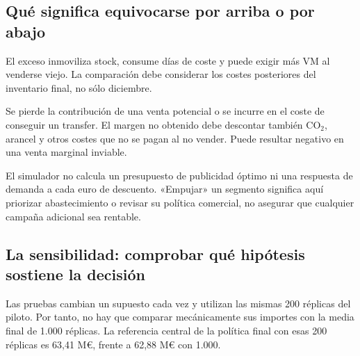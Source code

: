 \subsection{Qué significa equivocarse por arriba o por abajo}
\begin{description}[style=nextline]
\item[Pasarse.] El exceso inmoviliza stock, consume días de coste y puede exigir
más VM al venderse viejo. La comparación debe considerar los costes posteriores
del inventario final, no sólo diciembre.
\item[Quedarse corto.] Se pierde la contribución de una venta potencial o se
incurre en el coste de conseguir un transfer. El margen no obtenido debe
descontar también CO$_2$, arancel y otros costes que no se pagan al no vender.
Puede resultar negativo en una venta marginal inviable.
\end{description}
El simulador no calcula un presupuesto de publicidad óptimo ni una respuesta de
demanda a cada euro de descuento. «Empujar» un segmento significa aquí priorizar
abastecimiento o revisar su política comercial, no asegurar que cualquier campaña
adicional sea rentable.

\subsection{La sensibilidad: comprobar qué hipótesis sostiene la decisión}
Las pruebas cambian un supuesto cada vez y utilizan las mismas 200 réplicas del
piloto. Por tanto, no hay que comparar mecánicamente sus importes con la media
final de 1.000 réplicas. La referencia central de la política final con esas
200 réplicas es 63,41 M\euro{}, frente a 62,88 M\euro{} con 1.000.

